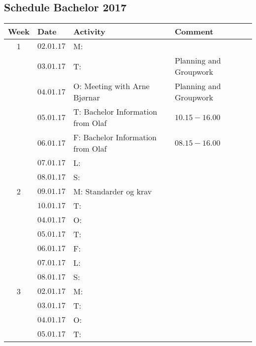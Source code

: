 \documentclass{article}
\begin{document}
\begin{center}
\section*{\textbf{Schedule Bachelor 2017}}
\begin{tabular}{|c|l|l|l|}
\hline
\rowcolor{cadetgrey}
\textbf{Week}    &\textbf{Date} 	 &\textbf{Activity}     &\textbf{Comment}  \\
\hline
1	      & $02.01.17$       & M:    &                         \\\rowcolor{gainsboro}
          & $03.01.17$       & T:    & Planning and Groupwork  \\
          & $04.01.17$       & O: Meeting with Arne Bjørnar    & Planning and Groupwork  \\\rowcolor{gainsboro}
          & $05.01.17$       & T: Bachelor Information from Olaf & $10.15-16.00$ \\
          & $06.01.17$       & F: Bachelor Information from Olaf & $08.15-16.00$ \\\rowcolor{gainsboro}
          & $07.01.17$       & L:    &             \\    
          & $08.01.17$       & S:    &             \\
\hline                                                \rowcolor{gainsboro}    
2	      & $09.01.17$       & M: Standarder og krav    &             \\
          & $10.01.17$       & T:    &             \\ \rowcolor{gainsboro}
          & $04.01.17$       & O:    &             \\
          & $05.01.17$       & T:    &             \\ \rowcolor{gainsboro}
          & $06.01.17$       & F:    &             \\
          & $07.01.17$       & L:    &             \\ \rowcolor{gainsboro}  
          & $08.01.17$       & S:    &             \\
\hline                                                         
3	      & $02.01.17$       & M:    &              \\\rowcolor{gainsboro}
          & $03.01.17$       & T:    &              \\
          & $04.01.17$       & O:    &              \\\rowcolor{gainsboro}
          & $05.01.17$       & T:    &              \\

\end{tabular}
\end{center}
\end{document}
